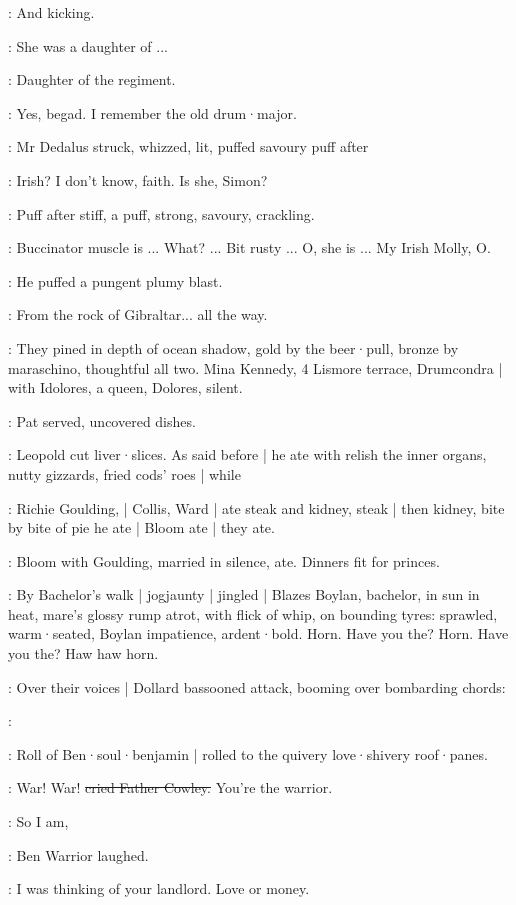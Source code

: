 \simon:
And kicking.

\dollard:
She was a daughter of ...

\simon:
Daughter of the regiment.

\dollard:
Yes,
begad.
I remember the old drum·major.

:
Mr Dedalus struck,
whizzed,
lit,
puffed savoury puff after

\dollard:
Irish?
I don't know,
faith.
Is she,
Simon?

:
Puff after stiff,
a puff,
strong,
savoury,
crackling.

\simon:
Buccinator muscle is ...
What?
...
Bit rusty ...
O,
she is ...
My Irish Molly,
O.

:
He puffed a pungent plumy blast.

\simon:
From the rock of Gibraltar...
all the way.

:
They pined in depth of ocean shadow,
gold by the beer·pull,
bronze by ma\-ra\-schi\-no,
thoughtful all two.
Mina Kennedy,
4 Lismore terrace,
Drumcondra |
with Idolores,
a queen,
Dolores,
silent.

:
Pat served,
uncovered dishes.

:
Leopold cut liver·slices.
As said before |
he ate with relish the inner organs,
nutty gizzards,
fried cods' roes |
while

:
Richie Goulding, |
Collis, Ward |
ate steak and kidney,
steak |
then kidney,
bite by bite of pie he ate |
Bloom ate |
they ate.

:
Bloom with Goulding,
married in silence,
ate.
Dinners fit for princes.

:
By Bachelor's walk |
jogjaunty |
jingled |
Blazes Boylan,
bachelor,
in sun
in heat,
mare's glossy rump atrot,
with flick of whip,
on bounding tyres:
sprawled,
warm·seated,
Boylan impatience,
ardent·bold.
Horn.
Have you the?
Horn.
Have you the?
Haw haw horn.

:
Over their voices |
Dollard bassooned attack,
booming over bombarding chords:

\dollard:

:
Roll of Ben·soul·benjamin |
rolled to the quivery love·shivery roof·panes.

\cowley:
War!
War!
\sout{cried Father Cowley.}
You're the warrior.

\dollard:
So I am,

:
Ben Warrior laughed.

\dollard:
I was thinking of your landlord.
Love or money.

